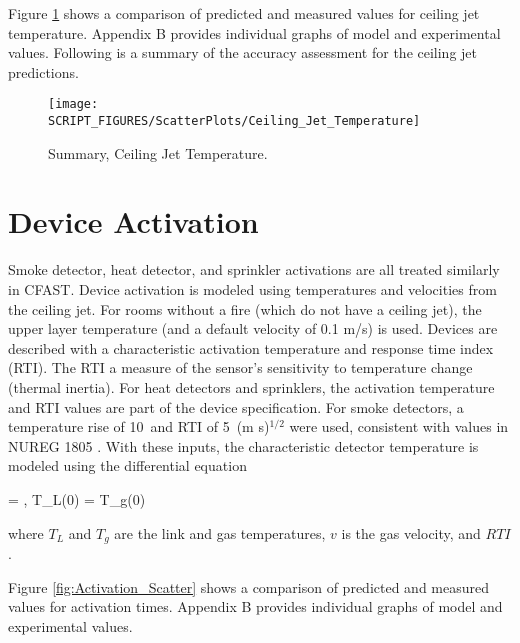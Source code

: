 Figure \ref{fig:Ceiling_Jet_Scatter} shows a comparison of predicted and measured values for ceiling jet temperature. Appendix B provides individual graphs of model and experimental values. Following is a summary of the accuracy assessment for the ceiling jet predictions.
\label{Ceiling Jet Temperature}

\begin{figure}
\begin{center}
\texttt{[image: SCRIPT\_FIGURES/ScatterPlots/Ceiling\_Jet\_Temperature]}
\end{center}
\caption[Summary, Ceiling Jet Temperature]{Summary, Ceiling Jet Temperature.}
\label{fig:Ceiling_Jet_Scatter}
\end{figure}

\section{Device Activation}

Smoke detector, heat detector, and sprinkler activations are all treated similarly in CFAST.  Device activation is modeled using temperatures and velocities from the ceiling jet.  For rooms without a fire (which do not have a ceiling jet), the upper layer temperature (and a default velocity of 0.1 m/s) is used.  Devices are described with a characteristic activation temperature and response time index (RTI). The RTI a measure of the sensor's sensitivity to temperature change (thermal inertia). For heat detectors and sprinklers, the activation temperature and RTI values are part of the device specification. For smoke detectors, a temperature rise of 10~\degc and RTI of 5~(m s)$^{1/2}$ were used, consistent with values in NUREG 1805 \cite{NRCNUREG1805}. With these inputs, the characteristic detector temperature is modeled using the differential equation \cite{Heskestad:1976}

\be {} =   \; , \; T_L(0) = T_g(0)  \ee

where $T_L$ and $T_g$ are the link and gas temperatures, $v$ is the gas velocity, and $RTI$.

Figure \ref{fig:Activation_Scatter} shows a comparison of predicted and measured values for activation times. Appendix B provides individual graphs of model and experimental values.
\label{Smoke Alarm Activation Time (Temperature Surrogate)}
\label{Smoke Alarm Activation Time (Smoke Obscuration)}
\label{Sprinkler Activation Time}

